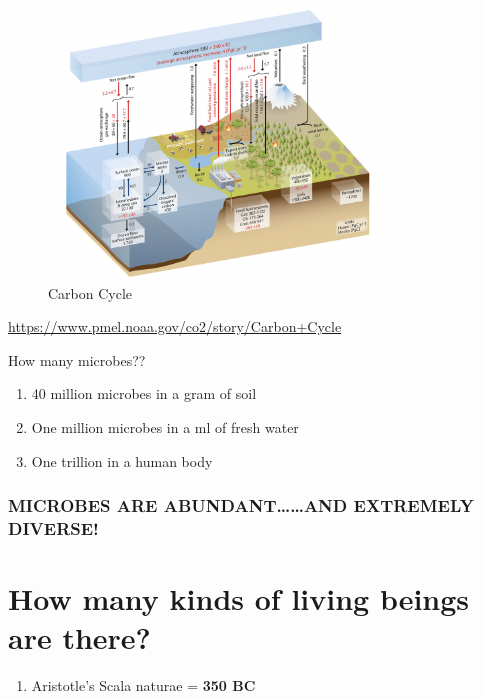 \documentclass[
]{book}
\providecommand{\tightlist}{%
  \setlength{\itemsep}{0pt}\setlength{\parskip}{0pt}}
\begin{document}
\begin{figure}
\centering
\includegraphics[width=0.8\textwidth,height=\textheight]{./Figures/Carbon1.png}
\caption{Carbon Cycle}
\end{figure}

\url{https://www.pmel.noaa.gov/co2/story/Carbon+Cycle}

How many microbes??

\begin{enumerate}
\def\labelenumi{\arabic{enumi}.}
\tightlist
\item
  40 million microbes in a gram of soil
\item
  One million microbes in a ml of fresh water
\item
  One trillion in a human body
\end{enumerate}

\hypertarget{microbes-are-abundantand-extremely-diverse}{%
\subsubsection*{MICROBES ARE ABUNDANT\ldots\ldots AND EXTREMELY DIVERSE!}\label{microbes-are-abundantand-extremely-diverse}}

\hypertarget{how-many-kinds-of-living-beings-are-there}{%
\section{How many kinds of living beings are there?}\label{how-many-kinds-of-living-beings-are-there}}

\begin{enumerate}
\def\labelenumi{\arabic{enumi}.}
\tightlist
\item
  Aristotle's Scala naturae
  = \textbf{350 BC}
\end{enumerate}
\end{document}
